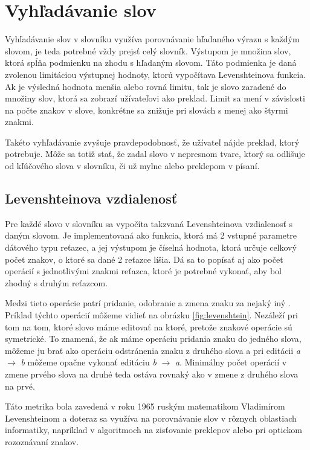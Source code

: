 \documentclass[
  digital, %
  table,   %
  lof,     %
  lot,     %
]{fithesis3}
\begin{document}
\section{Vyhľadávanie slov}
Vyhľadávanie slov v slovníku využíva porovnávanie hľadaného výrazu s každým slovom, je teda potrebné vždy prejsť celý slovník. Výstupom je množina slov, ktorá spĺňa podmienku na zhodu s hľadaným slovom. Táto podmienka je daná zvolenou limitáciou výstupnej hodnoty, ktorú vypočítava Levenshteinova funkcia. Ak je výsledná hodnota menšia alebo rovná limitu, tak je slovo zaradené do množiny slov, ktorá sa zobrazí užívateľovi ako preklad. Limit sa mení v závislosti na počte znakov v slove, konkrétne sa znižuje pri slovách s menej ako štyrmi znakmi.

Takéto vyhľadávanie zvyšuje pravdepodobnosť, že užívateľ nájde preklad, ktorý potrebuje. Môže sa totiž stať, že zadal slovo v nepresnom tvare, ktorý sa odlišuje od kľúčového slova v slovníku, či už mylne alebo preklepom v písaní.


\subsection{Levenshteinova vzdialenosť}
Pre každé slovo v slovníku sa vypočíta takzvaná Levenshteinova vzdialenosť s daným slovom. Je implementovaná ako funkcia, ktorá má 2 vstupné parametre dátového typu reťazec, a jej výstupom je číselná hodnota, ktorá určuje celkový počet znakov, o ktoré sa dané 2 reťazce líšia. Dá sa to popísať aj ako počet operácií s jednotlivými znakmi reťazca, ktoré je potrebné vykonať, aby bol zhodný s druhým reťazcom.

Medzi tieto operácie patrí pridanie, odobranie a zmena znaku za nejaký iný \parencite{levenshtein1966binary}. Príklad týchto operácií môžeme vidieť na obrázku \ref{fig:levenshtein}. Nezáleží pri tom na tom, ktoré slovo máme editovať na ktoré, pretože znakové operácie sú symetrické. To znamená, že ak máme operáciu pridania znaku do jedného slova, môžeme ju brať ako operáciu odstránenia znaku z druhého slova a pri editácii \textit{a} $\rightarrow$ \textit{b} môžeme opačne vykonať editáciu \textit{b} $\rightarrow$ \textit{a}. Minimálny počet operácií v zmene prvého slova na druhé teda ostáva rovnaký ako v zmene z druhého slova na prvé.

Táto metrika bola zavedená v roku 1965 ruským matematikom Vladimírom Levenshteinom a doteraz sa využíva na porovnávanie slov v rôznych oblastiach informatiky, napríklad v algoritmoch na zisťovanie preklepov alebo pri optickom rozoznávaní znakov.
\end{document}
